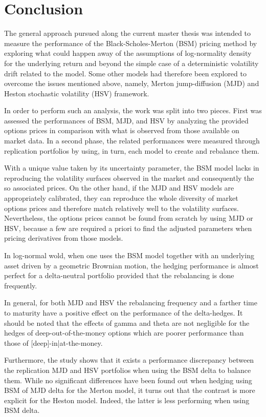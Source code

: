 \documentclass[a4paper, 12pt]{report}
\begin{document}
\chapter{Conclusion}
\label{cha:conclusion}


The general approach pursued along the current master thesis was intended to measure the performance of the Black-Scholes-Merton (BSM) pricing method by exploring what could happen away of the assumptions of log-normality density for the underlying return and beyond the simple case of a deterministic volatility drift related to the model.
Some other models had therefore been explored to overcome the issues mentioned above, namely,  Merton jump-diffusion (MJD) and Heston stochastic volatility (HSV) framework.

In order to perform such an analysis, the work was split into two pieces. First was assessed the performances of BSM, MJD, and HSV by analyzing the provided options prices in comparison with what is observed from those available on market data. 
In a second phase, the related performances were measured through replication portfolios by using, in turn, each model to create and rebalance them.

With a unique value taken by its uncertainty parameter, the BSM model lacks in reproducing the volatility surfaces observed in the market and consequently the so associated prices.
On the other hand, if the MJD and HSV models are appropriately calibrated, they can reproduce the whole diversity of market options prices and therefore match relatively well to the volatility surfaces. 
Nevertheless, the options prices cannot be found from scratch by using MJD or HSV, because a few are required a priori to find the adjusted parameters when pricing derivatives from those models.

In log-normal wold, when one uses the BSM model together with an underlying asset driven by a geometric Brownian motion, the hedging performance is almost perfect for a delta-neutral portfolio provided that the rebalancing is done frequently.

In general, for both MJD and HSV the rebalancing frequency and a farther time to maturity have a positive effect on the performance of the delta-hedges. It should be noted that the effects of gamma and theta are not negligible for the hedges of deep-out-of-the-money options which are poorer performance than those of [deep]-in|at-the-money.

Furthermore, the study shows that it exists a performance discrepancy between the replication MJD and HSV portfolios when using the BSM delta to balance them. While no significant differences have been found out when hedging using BSM of MJD delta for the Merton model, it turns out that the contrast is more explicit for the Heston model. Indeed, the latter is less performing when using BSM delta.
\end{document}
